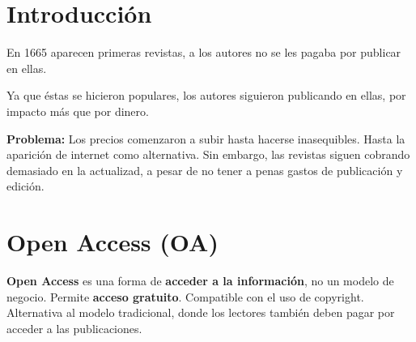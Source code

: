\documentclass[a0,portrait]{a0poster}
\begin{document}

\begin{multicols}{2} %



\color{Black} %
\section*{Introducción}

\begin{tcolorbox}[colback=openaccess!5!white,colframe=openaccess!75!black,boxsep=1cm]
  \setlength{\parskip}{0.5cm}
  
  En 1665 aparecen primeras revistas, a los autores no se les pagaba por publicar en ellas.

  Ya que éstas se hicieron populares, los autores siguieron publicando en ellas, por impacto más que por dinero.

  \textbf{Problema:} Los precios comenzaron a subir hasta hacerse inasequibles. Hasta la aparición de internet como alternativa. Sin embargo, las revistas siguen cobrando demasiado en la actualizad, a pesar de no tener a penas gastos de publicación y edición.
  
\end{tcolorbox}

\section*{Open Access (OA)}
\begin{tcolorbox}[colback=openaccess!5!white,colframe=openaccess!75!black,boxsep=1cm]
  \setlength{\parskip}{0.5cm}
  
\textbf{Open Access} es una forma de \textbf{acceder a la información}, no un modelo de negocio. Permite \textbf{acceso gratuito}. Compatible con el uso de copyright. Alternativa al modelo tradicional, donde los lectores también deben pagar por acceder a las publicaciones.


\end{tcolorbox}
\end{multicols}
\end{document}
